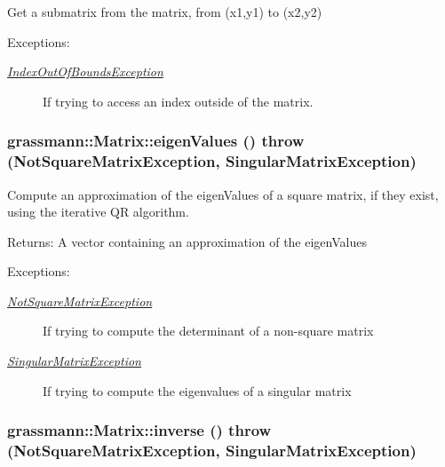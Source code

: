 Get a submatrix from the matrix, from (x1,y1) to (x2,y2) \begin{Desc}
\item[Exceptions:]
\begin{description}
\item[{\em \hyperlink{classgrassmann_1_1IndexOutOfBoundsException}{IndexOutOfBoundsException}}]If trying to access an index outside of the matrix. \end{description}
\end{Desc}


\hypertarget{classgrassmann_1_1Matrix_d6722b369c1720870f1d9902275bce9f}{
\subsubsection[eigenValues]{ grassmann::Matrix::eigenValues ()  throw ({\bf NotSquareMatrixException}, {\bf SingularMatrixException})}}
\label{classgrassmann_1_1Matrix_d6722b369c1720870f1d9902275bce9f}


Compute an approximation of the eigenValues of a square matrix, if they exist, using the iterative QR algorithm. 

\begin{Desc}
\item[Returns:]A vector containing an approximation of the eigenValues \end{Desc}
\begin{Desc}
\item[Exceptions:]
\begin{description}
\item[{\em \hyperlink{classgrassmann_1_1NotSquareMatrixException}{NotSquareMatrixException}}]If trying to compute the determinant of a non-square matrix \item[{\em \hyperlink{classgrassmann_1_1SingularMatrixException}{SingularMatrixException}}]If trying to compute the eigenvalues of a singular matrix \end{description}
\end{Desc}
\hypertarget{classgrassmann_1_1Matrix_7cdc98693169505c56a3df3f3194bbb5}{
\subsubsection[inverse]{ grassmann::Matrix::inverse ()  throw ({\bf NotSquareMatrixException}, {\bf SingularMatrixException})}}
\label{classgrassmann_1_1Matrix_7cdc98693169505c56a3df3f3194bbb5}


